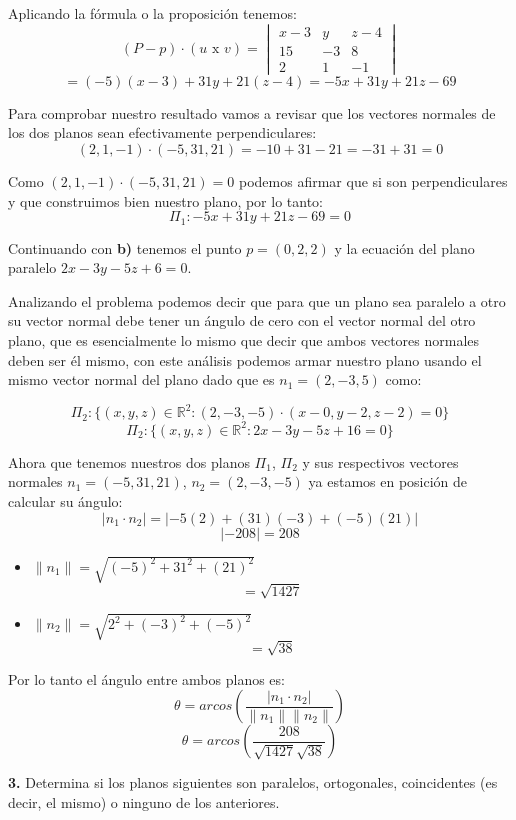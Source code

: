 \documentclass{article}
\begin{document}
Aplicando la fórmula o la proposición tenemos:
$$(P-p)\cdot(u \text{ x } v) = \begin{vmatrix}
   x-3 & y &  z-4 \\
   15 & -3 & 8 \\
   2 & 1 & -1
\end{vmatrix}$$
$$=(-5)(x-3)+31y+21(z-4) = -5x+31y+21z-69 $$


Para comprobar nuestro resultado vamos a revisar que los vectores normales de los dos planos sean efectivamente perpendiculares:
$$(2,1,-1)\cdot (-5,31,21) = -10+31-21 = -31+31 = 0$$


Como $(2,1,-1)\cdot (-5,31,21) = 0 $ podemos afirmar que si son perpendiculares y que construimos bien nuestro plano, por lo tanto:
$$\Pi_1 : -5x+31y+21z-69 = 0$$


Continuando con \textbf{b)} tenemos el punto $p = (0,2,2)$ y la ecuación del plano paralelo $2x - 3y - 5z + 6 = 0$.


Analizando el problema podemos decir que para que un plano sea paralelo a otro su vector normal debe tener un ángulo de cero con el vector normal del otro plano, que es esencialmente
lo mismo que decir que ambos vectores normales deben ser él mismo, con este análisis podemos armar nuestro plano usando el mismo vector normal del plano dado que es $n_1 =(2,-3,5)$ como:


$$\Pi_2 : \{(x,y,z) \in \mathbb{R}^2: (2,-3,-5)\cdot (x-0, y-2, z-2 )=0\}$$
$$\Pi_2: \{(x,y,z) \in \mathbb{R}^2: 2x -3y-5z+16 = 0\}$$


Ahora que tenemos nuestros dos planos $\Pi_1$, $\Pi_2$ y sus respectivos vectores normales $n_1 =(-5,31,21)$, $n_2=(2,-3,-5)$ ya estamos en posición de calcular su ángulo:
$$\left| n_1 \cdot n_2\right| = \left|-5(2)+(31)(-3)+(-5)(21)\right|$$
$$\left|-208\right| = 208$$
\begin{itemize}
   \item$\|n_1\| = \sqrt{(-5)^2+31^2+(21)^2}$
   $$=\sqrt{1427}$$
   \item $\|n_2\| = \sqrt{2^2+(-3)^2+(-5)^2}$
   $$= \sqrt{38}$$
\end{itemize}


Por lo tanto el ángulo entre ambos planos es:
$$\theta = arcos\left(\frac{\left|n_1\cdot n_2\right|}{\|n_1\|\|n_2\|}\right)$$
$$\theta = arcos\left(\frac{208}{\sqrt{1427}\sqrt{38}}\right)$$
\vspace*{10pt}


\textbf{3.} Determina si los planos siguientes son paralelos, ortogonales, coincidentes (es decir, el
mismo) o ninguno de los anteriores.
\vspace{10pt}
\end{document}
